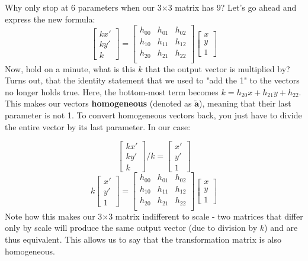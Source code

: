 \documentclass{article}
\begin{document}
Why only stop at 6 parameters when our 3$\times$3 matrix has 9? Let's go ahead and express the new formula:
\[
\begin{bmatrix}
kx' \\
ky' \\
k
\end{bmatrix}
=
\begin{bmatrix}
h_{00} & h_{01} & h_{02} \\
h_{10} & h_{11} & h_{12} \\
h_{20} & h_{21} & h_{22} \\
\end{bmatrix}
\begin{bmatrix}
x \\
y \\
1
\end{bmatrix}
\]
\noindent
Now, hold on a minute, what is this $k$ that the output vector is multiplied by? Turns out, that the identity statement that we used to "add the 1" to the vectors no longer holds true. Here, the bottom-most term becomes $k = h_{20}x + h_{21}y + h_{22}$.
This makes our vectors \textbf{homogeneous} (denoted as $\mathbf{\tilde a}$), meaning that their last parameter is not 1. To convert homogeneous vectors back, you just have to divide the entire vector by its last parameter. In our case:

\[
\begin{bmatrix}
kx' \\
ky' \\
k
\end{bmatrix}
/ k = 
\begin{bmatrix}
x' \\
y' \\
1
\end{bmatrix}
\]
\[
k
\begin{bmatrix}
x' \\
y' \\
1
\end{bmatrix}
=
\begin{bmatrix}
h_{00} & h_{01} & h_{02} \\
h_{10} & h_{11} & h_{12} \\
h_{20} & h_{21} & h_{22} \\
\end{bmatrix}
\begin{bmatrix}
x \\
y \\
1
\end{bmatrix}
\]
\noindent
Note how this makes our 3$\times$3 matrix indifferent to scale - two matrices that differ only by scale will produce the same output vector (due to division by $k$) and are thus equivalent. This allows us to say that the transformation matrix is also homogeneous.
\end{document}
